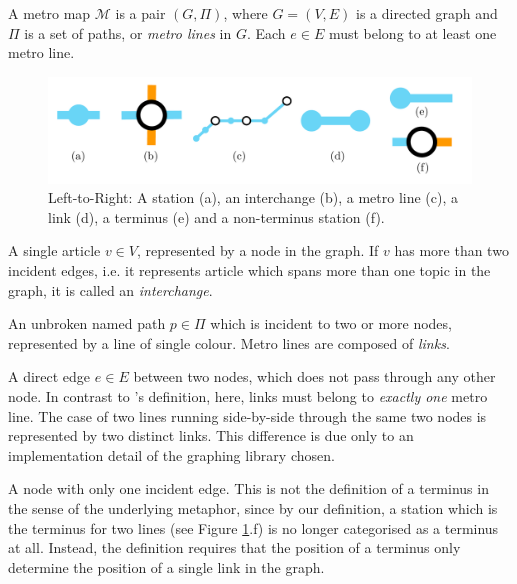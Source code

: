 \addtocounter{definition}{-1}
\begin{definition}{}
A metro map $\mathcal{M}$ is a pair $(G, \Pi)$, where $G=(V, E)$ is a directed graph and $\Pi$ is a set of paths, or \textit{metro lines} in $G$. Each $e \in E$ must belong to at least one metro line.
\end{definition}
\vspace{-0.5cm}
\begin{figure}[htbp!]
	\centering
	\includegraphics[width=\textwidth]{img/implementation/mapdefinitions.pdf}
	\vspace{-0.5cm}\caption{Left-to-Right: A station (a), an interchange (b), a metro line (c), a link (d), a terminus (e) and a non-terminus station (f).}
	\label{fig:mapdefinitions}
\end{figure}
\begin{description}[leftmargin=7em,style=nextline]
	\item [Station] A single article $v \in V$, represented by a node in the graph. If $v$ has more than two incident edges, i.e. it represents article which spans more than one topic in the graph, it is called an \textit{interchange}.
	\item [Metro Line] An unbroken named path $p \in \Pi$ which is incident to two or more nodes, represented by a line of single colour. Metro lines are composed of \textit{links}.
	\item [Link] A direct edge $e \in E$ between two nodes, which does not pass through any other node. In contrast to \citeauthor{GeneratingInformationMaps}'s definition, here, links must belong to \textit{exactly one} metro line. The case of two lines running side-by-side through the same two nodes is represented by two distinct links. This difference is due only to an implementation detail of the graphing library chosen.
	\item [Terminus] A node with only one incident edge. This is not the definition of a terminus in the sense of the underlying metaphor, since by our definition, a station which is the terminus for two lines (see Figure \ref{fig:mapdefinitions}.f) is no longer categorised as a terminus at all. Instead, the definition requires that the position of a terminus only determine the position of a single link in the graph.
\end{description}

